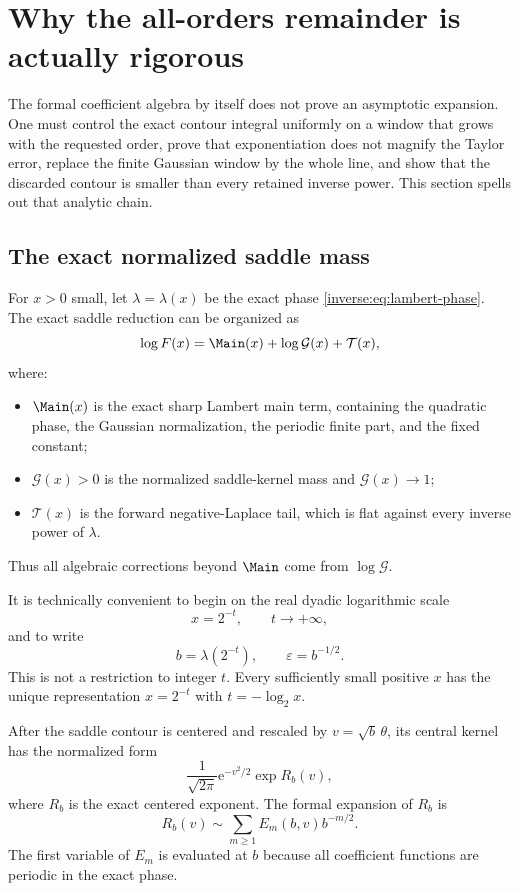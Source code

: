 \documentclass[11pt,oneside]{article}
\theoremstyle{definition}
\theoremstyle{remark}
\newcommand{\e}{\mathrm e}
\begin{document}
\section{Why the all-orders remainder is actually rigorous}
\label{inverse:sec:all-orders-proof}

The formal coefficient algebra by itself does not prove an asymptotic
expansion.  One must control the exact contour integral uniformly on a
window that grows with the requested order, prove that exponentiation does
not magnify the Taylor error, replace the finite Gaussian window by the
whole line, and show that the discarded contour is smaller than every
retained inverse power.  This section spells out that analytic chain.

\subsection{The exact normalized saddle mass}

For $x>0$ small, let $\lambda=\lambda(x)$ be the exact phase
\eqref{inverse:eq:lambert-phase}.  The exact saddle reduction can be organized as
\begin{equation}
 \log F(x)
 =\Main(x)+\log\mathcal G(x)+\mathcal T(x),
 \label{inverse:eq:exact-saddle-reduction}
\end{equation}
where:
\begin{itemize}
\item $\Main(x)$ is the exact sharp Lambert main term, containing the
quadratic phase, the Gaussian normalization, the periodic finite part, and
the fixed constant;
\item $\mathcal G(x)>0$ is the normalized saddle-kernel mass and
$\mathcal G(x)\to1$;
\item $\mathcal T(x)$ is the forward negative-Laplace tail, which is flat
against every inverse power of $\lambda$.
\end{itemize}
Thus all algebraic corrections beyond $\Main$ come from $\log\mathcal G$.

It is technically convenient to begin on the real dyadic logarithmic
scale
\[
 x=2^{-t},\qquad t\to+\infty,
\]
and to write
\[
 b=\lambda(2^{-t}),\qquad \varepsilon=b^{-1/2}.
\]
This is not a restriction to integer $t$.  Every sufficiently small
positive $x$ has the unique representation $x=2^{-t}$ with
$t=-\log_2x$.

After the saddle contour is centered and rescaled by
$v=\sqrt b\,\theta$, its central kernel has the normalized form
\begin{equation}
 \frac1{\sqrt{2\pi}}\e^{-v^2/2}
 \exp R_b(v), \label{inverse:eq:normalized-central-kernel}
\end{equation}
where $R_b$ is the exact centered exponent.  The formal expansion of
$R_b$ is
\begin{equation}
 R_b(v)\sim\sum_{m\geq1}E_m(b,v)b^{-m/2}.
 \label{inverse:eq:R-formal}
\end{equation}
The first variable of $E_m$ is evaluated at $b$ because all coefficient
functions are periodic in the exact phase.
\end{document}
